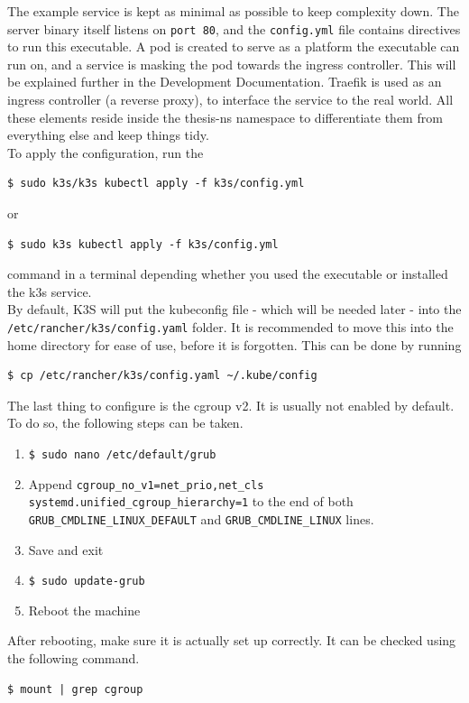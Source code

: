 The example service is kept as minimal as possible to keep complexity down. The server binary itself listens on \texttt{port 80}, and the \texttt{config.yml} file contains directives to run this executable. A pod is created to serve as a platform the executable can run on, and a service is masking the pod towards the ingress controller. This will be explained further in the Development Documentation. Traefik is used as an ingress controller (a reverse proxy), to interface the service to the real world. All these elements reside inside the thesis-ns namespace to differentiate them from everything else and keep things tidy. \\

\noindent
To apply the configuration, run the
\begin{verbatim}
$ sudo k3s/k3s kubectl apply -f k3s/config.yml
\end{verbatim}
or 
\begin{verbatim}
$ sudo k3s kubectl apply -f k3s/config.yml
\end{verbatim}
\noindent
command in a terminal depending whether you used the executable or installed the k3s service. \\

\label{sec:k3syaml}By default, K3S will put the kubeconfig file - which will be needed later - into the \texttt{/etc/rancher/k3s/config.yaml} folder. It is recommended to move this into the home directory for ease of use, before it is forgotten. This can be done by running
\begin{verbatim}
$ cp /etc/rancher/k3s/config.yaml ~/.kube/config
\end{verbatim}

\newpage
The last thing to configure is the cgroup v2. It is usually not enabled by default. To do so, the following steps can be taken.
\begin{enumerate}
	\item \texttt{\$ sudo nano /etc/default/grub}
	\item Append \texttt{cgroup\_no\_v1=net\_prio,net\_cls systemd.unified\_cgroup\_hierarchy=1} to the end of both \texttt{GRUB\_CMDLINE\_LINUX\_DEFAULT} and \texttt{GRUB\_CMDLINE\_LINUX} lines.
	\item Save and exit
	\item \texttt{\$ sudo update-grub}
	\item Reboot the machine
\end{enumerate}

After rebooting, make sure it is actually set up correctly. It can be checked using the following command.
\begin{verbatim}
$ mount | grep cgroup
\end{verbatim}

